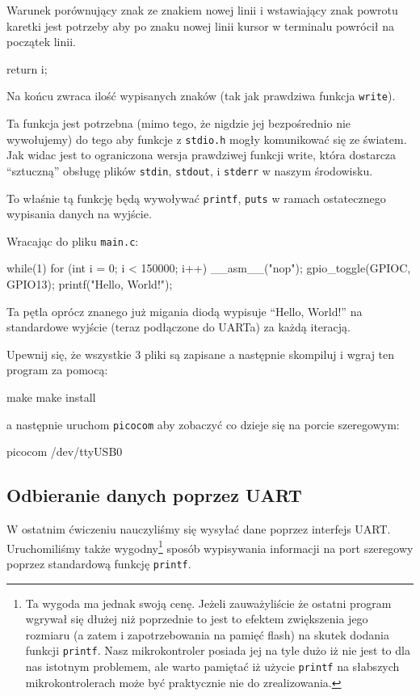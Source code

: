 \documentclass{pdfBooklets}
\begin{document}
Warunek porównujący znak ze znakiem nowej linii i wstawiający znak powrotu karetki jest potrzeby aby po znaku nowej linii kursor w terminalu powrócił
na początek linii.


\begin{CodeFrame*}[c]{}
  return i;
\end{CodeFrame*}

Na końcu zwraca ilość wypisanych znaków (tak jak prawdziwa funkcja \Verb$write$).

Ta funkcja jest potrzebna (mimo tego, że nigdzie jej bezpośrednio nie wywołujemy) do tego aby funkcje z \Verb$stdio.h$ mogły komunikować się ze światem.
Jak widac jest to ograniczona wersja prawdziwej funkcji write, która dostarcza ``sztuczną'' obsługę plików \Verb$stdin$, \Verb$stdout$, i \Verb$stderr$
w naszym środowisku. 

To właśnie tą funkcję będą wywoływać \Verb$printf$, \Verb$puts$ w ramach ostatecznego wypisania danych na wyjście.

Wracając do pliku \Verb$main.c$:

\begin{CodeFrame*}[c]{}
  while(1){
    for (int i = 0; i < 150000; i++) __asm__("nop");
    gpio_toggle(GPIOC, GPIO13);
    printf("Hello, World!\n");
  }
\end{CodeFrame*}

Ta pętla oprócz znanego już migania diodą wypisuje ``Hello, World!'' na standardowe wyjście (teraz podłączone do UARTa) za każdą iteracją.


Upewnij się, że wszystkie 3 pliki są zapisane a następnie skompiluj i wgraj ten program za pomocą:

\begin{CodeFrame*}[bash]{}
  make
  make install
\end{CodeFrame*}

a następnie uruchom \Verb$picocom$ aby zobaczyć co dzieje się na porcie szeregowym:

\begin{CodeFrame*}[bash]{}
  picocom /dev/ttyUSB0
\end{CodeFrame*}

\subsection{Odbieranie danych poprzez UART}

W ostatnim ćwiczeniu nauczyliśmy się wysyłać dane poprzez interfejs UART. Uruchomiliśmy także wygodny\footnote{
	Ta wygoda ma jednak swoją cenę.
	Jeżeli zauważyliście że ostatni program wgrywał się dłużej niż poprzednie to jest to efektem zwiększenia jego rozmiaru (a zatem i zapotrzebowania na pamięć flash) na skutek dodania funkcji \Verb$printf$.
	Nasz mikrokontroler posiada jej na tyle dużo iż nie jest to dla nas istotnym problemem, ale warto pamiętać iż użycie \Verb$printf$ na słabszych mikrokontrolerach może być praktycznie nie do zrealizowania.
}
sposób wypisywania informacji na port szeregowy poprzez standardową funkcję \Verb$printf$.
\end{document}
